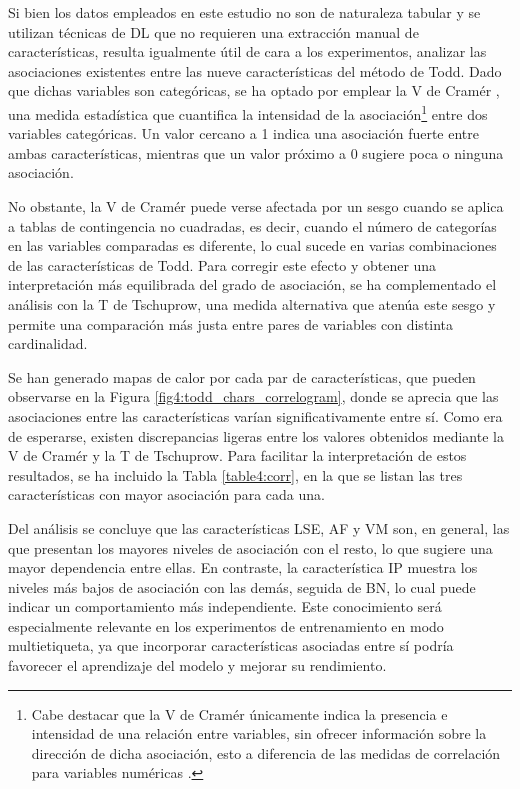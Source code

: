 Si bien los datos empleados en este estudio no son de naturaleza tabular y se utilizan técnicas de DL que no requieren una extracción manual de características, resulta igualmente útil de cara a los experimentos, analizar las asociaciones existentes entre las nueve características del método de Todd. Dado que dichas variables son categóricas, se ha optado por emplear la V de Cramér \cite{sheskin_handbook_2020}, una medida estadística que cuantifica la intensidad de la asociación\footnote{Cabe destacar que la V de Cramér únicamente indica la presencia e intensidad de una relación entre variables, sin ofrecer información sobre la dirección de dicha asociación, esto a diferencia de las medidas de correlación para variables numéricas \cite{jimenez_nota_2024}.} entre dos variables categóricas. Un valor cercano a 1 indica una asociación fuerte entre ambas características, mientras que un valor próximo a 0 sugiere poca o ninguna asociación.

No obstante, la V de Cramér puede verse afectada por un sesgo cuando se aplica a tablas de contingencia no cuadradas, es decir, cuando el número de categorías en las variables comparadas es diferente, lo cual sucede en varias combinaciones de las características de Todd. Para corregir este efecto y obtener una interpretación más equilibrada del grado de asociación, se ha complementado el análisis con la T de Tschuprow, una medida alternativa que atenúa este sesgo y permite una comparación más justa entre pares de variables con distinta cardinalidad.

Se han generado mapas de calor por cada par de características, que pueden observarse en la Figura \ref{fig4:todd_chars_correlogram}, donde se aprecia que las asociaciones entre las características varían significativamente entre sí. Como era de esperarse, existen discrepancias ligeras entre los valores obtenidos mediante la V de Cramér y la T de Tschuprow. Para facilitar la interpretación de estos resultados, se ha incluido la Tabla \ref{table4:corr}, en la que se listan las tres características con mayor asociación para cada una.

Del análisis se concluye que las características LSE, AF y VM son, en general, las que presentan los mayores niveles de asociación con el resto, lo que sugiere una mayor dependencia entre ellas. En contraste, la característica IP muestra los niveles más bajos de asociación con las demás, seguida de BN, lo cual puede indicar un comportamiento más independiente. Este conocimiento será especialmente relevante en los experimentos de entrenamiento en modo multietiqueta, ya que incorporar características asociadas entre sí podría favorecer el aprendizaje del modelo y mejorar su rendimiento.

